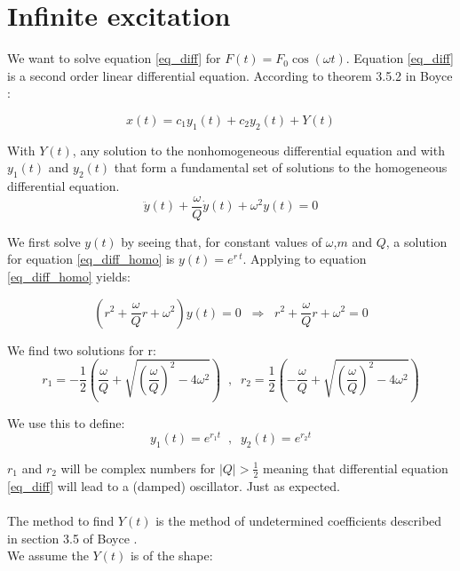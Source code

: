\section{Infinite excitation}

We want to solve equation \ref{eq_diff} for $F(t) = F_0 \cos(\omega t)$. Equation \ref{eq_diff} is a second order linear differential equation. According to theorem 3.5.2 in Boyce \cite{Boyce}:

\begin{equation}
	x(t) = c_1 y_1(t) + c_2 y_2(t) + Y(t)
	\label{eq_x_1_emtpy}
\end{equation}

With $Y(t)$, any solution to the nonhomogeneous differential equation and with $y_1(t)$ and $y_2(t)$ that form a fundamental set of solutions to the homogeneous differential equation.
\begin{equation}
	\ddot{y}(t) + \frac{\omega}{Q} \dot{y}(t) + \omega^2 y(t) = 0
	\label{eq_diff_homo}
\end{equation}

We first solve $y(t)$ by seeing that, for constant values of $\omega$,$m$ and $Q$, a solution for equation \ref{eq_diff_homo} is  $y(t) = e^{r \: t}$. Applying to equation \ref{eq_diff_homo} yields:

\begin{equation}
	(r^2 + \frac{\omega}{Q} r + \omega^2) y(t) = 0 \; \; \Rightarrow \; \; r^2 + \frac{\omega}{Q} r + \omega^2 = 0
	\label{eq_characteristic}
\end{equation}

We find two solutions for r:
\begin{equation*}
	r_1 = - \frac{1}{2} \left( \frac{\omega}{Q} + \sqrt{\left( \frac{\omega}{Q} \right)^2 -4 \omega^2} \right) \; \; , \; \; r_2 = \frac{1}{2} \left( -\frac{\omega}{Q} + \sqrt{\left( \frac{\omega}{Q} \right)^2 -4 \omega^2} \right)
\end{equation*}

We use this to define:
\begin{equation*}
	y_1(t) = e^{r_1 t} \; \; , \; \; y_2(t) = e^{r_2 t}
\end{equation*}

$r_1$ and $r_2$ will be complex numbers for $\mid Q \mid > \frac{1}{2}$ meaning that differential equation \ref{eq_diff} will lead to a (damped) oscillator. Just as expected.\\
\\
The method to find $Y(t)$ is the method of undetermined coefficients described in section 3.5 of Boyce \cite{Boyce}.\\
We assume the $Y(t)$ is of the shape:

